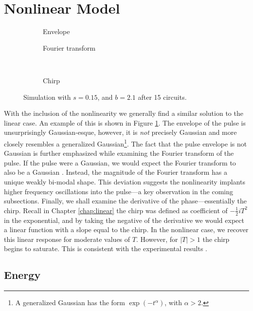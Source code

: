 \section{Nonlinear Model}
\begin{figure}[tbp]
\centering
\begin{subfigure}{0.5\textwidth}
\centering

\caption{Envelope}
\end{subfigure}%
\begin{subfigure}{0.5\textwidth}
\centering

\caption{Fourier transform}
\end{subfigure} \\
\begin{subfigure}{0.5\textwidth}
\centering

\caption{Chirp}
\end{subfigure}
\caption[Envelope, Fourier transform, and chirp of the pulse---stable case.]{Simulation with $s = 0.15$, and $b = 2.1$ after 15 circuits.}
\label{fig:nlstable}
\end{figure}
With the inclusion of the nonlinearity we generally find a similar solution to the linear case. An example of this is shown in Figure \ref{fig:nlstable}. The envelope of the pulse is unsurprisingly Gaussian-esque, however, it is \emph{not} precisely Gaussian and more closely resembles a generalized Gaussian\footnote{A generalized Gaussian has the form $\exp \left(-t^\alpha \right)$, with $\alpha > 2$.}. The fact that the pulse envelope is not Gaussian is further emphasized while examining the Fourier transform of the pulse. If the pulse were a Gaussian, we would expect the Fourier transform to also be a Gaussian \cite{debnath, gradshteyn}. Instead, the magnitude of the Fourier transform has a unique weakly bi-modal shape. This deviation suggests the nonlinearity implants higher frequency oscillations into the pulse---a key observation in the coming subsections. Finally, we shall examine the derivative of the phase---essentially the chirp. Recall in Chapter \ref{chap:linear} the chirp was defined as coefficient of $-\frac{1}{2}iT^2$ in the exponential, and by taking the negative of the derivative we would expect a linear function with a slope equal to the chirp. In the nonlinear case, we recover this linear response for moderate values of $T$. However, for $|T| > 1$ the chirp begins to saturate. This is consistent with the experimental results \cite{chen, rothenberg, tomlinson}.

\subsection{Energy}
\label{chap:energy}

